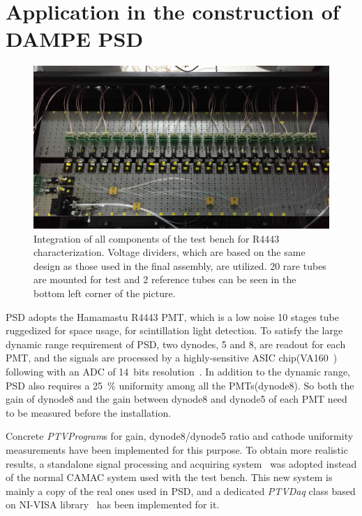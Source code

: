 \documentclass[review, times]{elsarticle}
\begin{document}
\section{Application in the construction of DAMPE PSD}
\label{sec:application}

\begin{figure}
 \centering
 \includegraphics[width=125mm]{FIG7}
\caption{Integration of all components of the test bench for R4443 characterization.
Voltage dividers, which are based on the same design as those used in the final assembly, are utilized. 
20 rare tubes are mounted for test and 2 reference tubes can be seen in the bottom left corner of the picture. 
}
\label{fig:FIG7}
\end{figure}

PSD adopts the Hamamastu R4443 PMT, which is a low noise 10 stages tube ruggedized for space usage, for scintillation light detection.
To satisfy the large dynamic range requirement of PSD, two dynodes, 5 and 8, are readout for each PMT, 
and the signals are processed by a highly-sensitive ASIC chip(VA160~\cite{va160}) following with an ADC of 14~bits resolution~\cite{fee}. 
In addition to the dynamic range, PSD also requires a \SI{25}{\percent} uniformity among all the PMTs(dynode8). 
So both the gain of dynode8 and the gain between dynode8 and dynode5 of each PMT need to be measured before the installation.

Concrete \textit{PTVProgram}s for gain, dynode8/dynode5 ratio and cathode uniformity measurements have been implemented for this purpose.
To obtain more realistic results, a standalone signal processing and acquiring system~\cite{fee} was adopted instead of the normal CAMAC system used with the test bench. 
This new system is mainly a copy of the real ones used in PSD, and a dedicated \textit{PTVDaq} class based on NI-VISA library~\cite{ni_visa} has been implemented for it.
\end{document}

